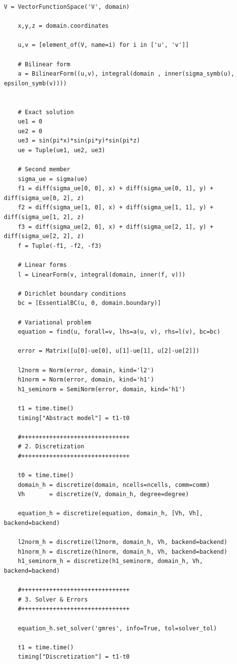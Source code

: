 \documentclass[a4paper,12pt,twoside]{report}
\begin{document}
\begin{lstlisting}[caption=Simulation code for the linear elasticity problem with Dirichlet boundary conditions.]
    V = VectorFunctionSpace('V', domain)

    x,y,z = domain.coordinates

    u,v = [element_of(V, name=i) for i in ['u', 'v']]

    # Bilinear form
    a = BilinearForm((u,v), integral(domain , inner(sigma_symb(u), epsilon_symb(v))))


    # Exact solution
    ue1 = 0
    ue2 = 0
    ue3 = sin(pi*x)*sin(pi*y)*sin(pi*z)
    ue = Tuple(ue1, ue2, ue3)

    # Second member
    sigma_ue = sigma(ue)
    f1 = diff(sigma_ue[0, 0], x) + diff(sigma_ue[0, 1], y) + diff(sigma_ue[0, 2], z)
    f2 = diff(sigma_ue[1, 0], x) + diff(sigma_ue[1, 1], y) + diff(sigma_ue[1, 2], z)
    f3 = diff(sigma_ue[2, 0], x) + diff(sigma_ue[2, 1], y) + diff(sigma_ue[2, 2], z)
    f = Tuple(-f1, -f2, -f3)

    # Linear forms
    l = LinearForm(v, integral(domain, inner(f, v)))

    # Dirichlet boundary conditions
    bc = [EssentialBC(u, 0, domain.boundary)]

    # Variational problem
    equation = find(u, forall=v, lhs=a(u, v), rhs=l(v), bc=bc)

    error = Matrix([u[0]-ue[0], u[1]-ue[1], u[2]-ue[2]])

    l2norm = Norm(error, domain, kind='l2')
    h1norm = Norm(error, domain, kind='h1')
    h1_seminorm = SemiNorm(error, domain, kind='h1')

    t1 = time.time()
    timing["Abstract model"] = t1-t0

    #+++++++++++++++++++++++++++++++
    # 2. Discretization
    #+++++++++++++++++++++++++++++++

    t0 = time.time()
    domain_h = discretize(domain, ncells=ncells, comm=comm)
    Vh       = discretize(V, domain_h, degree=degree)

    equation_h = discretize(equation, domain_h, [Vh, Vh], backend=backend)

    l2norm_h = discretize(l2norm, domain_h, Vh, backend=backend)
    h1norm_h = discretize(h1norm, domain_h, Vh, backend=backend)
    h1_seminorm_h = discretize(h1_seminorm, domain_h, Vh, backend=backend)

    #+++++++++++++++++++++++++++++++
    # 3. Solver & Errors
    #+++++++++++++++++++++++++++++++

    equation_h.set_solver('gmres', info=True, tol=solver_tol)

    t1 = time.time()
    timing["Discretization"] = t1-t0


\end{lstlisting}
\end{document}
